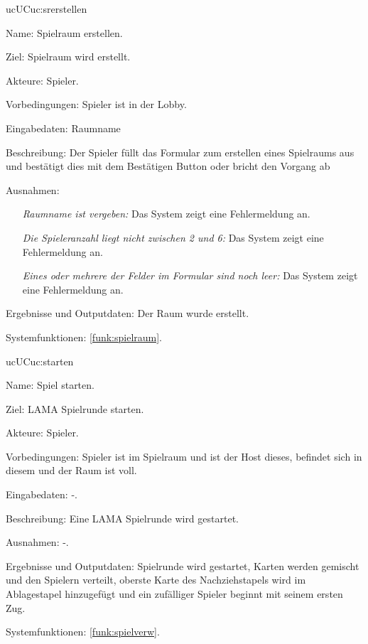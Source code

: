\begin{description}[leftmargin=5em, style=sameline]
	
	\begin{lhp}{uc}{UC}{uc:srerstellen} %
		\item [Name:] Spielraum erstellen.
		\item [Ziel:] Spielraum wird erstellt.
		\item [Akteure:] Spieler.
		\item [Vorbedingungen:] Spieler ist in der Lobby.
		\item [Eingabedaten:] Raumname 
		\item [Beschreibung:] Der Spieler füllt das Formular zum erstellen eines Spielraums aus und bestätigt dies mit dem Bestätigen Button oder bricht den Vorgang ab
		\item [Ausnahmen:] \hfill
		\begin{itemize} 
				\item[] \textit{Raumname ist vergeben:} Das System zeigt eine Fehlermeldung an.
				\item[] \textit{Die Spieleranzahl liegt nicht zwischen 2 und 6:} Das System zeigt eine Fehlermeldung an.
				\item[] \textit{Eines oder mehrere der Felder im Formular sind noch leer:} Das System zeigt eine Fehlermeldung an.
			\end{itemize}
		\item [Ergebnisse und Outputdaten:] Der Raum wurde erstellt.	
		\item [Systemfunktionen:] \ref{funk:spielraum}. %
	\end{lhp}
	
	 \begin{lhp}{uc}{UC}{uc:starten} %
		\item [Name:] Spiel starten.
		\item [Ziel:] LAMA Spielrunde starten.
		\item [Akteure:] Spieler.
		\item [Vorbedingungen:] Spieler ist im Spielraum und ist der Host dieses, befindet sich in diesem und der Raum ist voll.
		\item [Eingabedaten:] -.
		\item [Beschreibung:] Eine LAMA Spielrunde wird gestartet.
		\item [Ausnahmen:] -.
		\item [Ergebnisse und Outputdaten:] Spielrunde wird gestartet, Karten werden gemischt und den Spielern verteilt, oberste Karte des Nachziehstapels wird im Ablagestapel hinzugefügt und ein zufälliger Spieler beginnt mit seinem ersten Zug.
		\item [Systemfunktionen:] \ref{funk:spielverw}. %
	\end{lhp}
	

\end{description}
